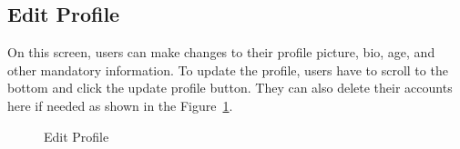 \subsection{Edit Profile}
On this screen, users can make changes to their profile picture, bio, age, and other mandatory information. To update the profile, users have to scroll to the bottom and click the update profile button. They can also delete their accounts here if needed as shown in the Figure~\ref{fig:edit-profile-screen}.
   \begin{figure}[H]
	\centering
	\hspace{5pt}
	\caption{Edit Profile}
	\label{fig:edit-profile-screen}
\end{figure}
